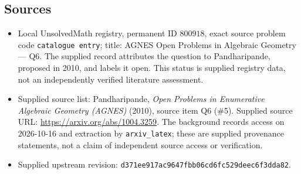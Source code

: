 \documentclass[11pt]{article}
\begin{document}
\subsection{Sources}
\begin{itemize}
\item Local UnsolvedMath registry, permanent ID \(800918\), exact source problem code \texttt{catalogue entry}; title: AGNES Open Problems in Algebraic Geometry --- Q6. The supplied record attributes the question to Pandharipande, proposed in 2010, and labels it open. This status is supplied registry data, not an independently verified literature assessment.
\item Supplied source list: Pandharipande, \emph{Open Problems in Enumerative Algebraic Geometry (AGNES)} (2010), source item Q6 (\#5). Supplied source URL: \url{https://arxiv.org/abs/1004.3259}. The background records access on 2026-10-16 and extraction by \texttt{arxiv\_latex}; these are supplied provenance statements, not a claim of independent source access or verification.
\item Supplied upstream revision: \texttt{d371ee917ac9647fbb06cd6fc529deec6f3dda82}.
\end{itemize}
\end{document}
